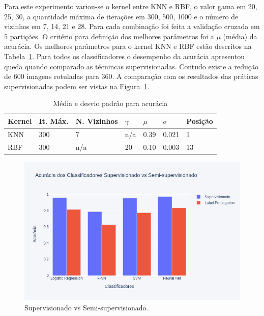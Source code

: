 \documentclass[a4paper, 12 pt, conference]{ieeeconf}  %
\begin{document}
Para este experimento variou-se o kernel entre KNN e RBF, o valor gama em 20, 25, 30, a quantidade máxima de iterações em 300, 500, 1000 e o número de vizinhos em 7, 14, 21 e 28. Para cada combinação foi feita a validação cruzada em 5 partições. O critério para definição dos melhores parâmetros foi a $\mu$ (média) da acurácia. Os melhores parâmetros para o kernel KNN e RBF estão descritos na Tabela~\ref{tab:meida_acuracia_lp_lbp}. Para todos os classificadores o desempenho da acurácia apresentou queda quando comparado as técnincas supervisionadas. Contudo existe a redução de 600 imagens rotuladas para 360. A comparação com os resultados das práticas supervisionadas podem ser vistas na Figura~\ref{fig:super_vs_semi_lbp}.


\begin{table}[!htbp]
    \caption{Média e desvio padrão para acurácia}
    \begin{center}
        \begin{tabular}{lllllll}
        	Kernel & It. Máx. & N. Vizinhos & $\gamma$ & $\mu$ & $\sigma$ & Posição \\
        	\hline
        	KNN    & 300             & 7                  & n/a  & 0.39       & 0.021               & 1       \\
        	\hline
        	RBF    & 300             & n/a                & 20   & 0.10       & 0.003               & 13      \\
        \end{tabular}
    \label{tab:meida_acuracia_lp_lbp}
    \end{center}
\end{table}

\begin{figure}[!htbp]
	\centering
	\includegraphics[width=1.0\linewidth,clip=true,trim=0cm 0cm 0cm 0cm, keepaspectratio=true]{bar_supervisionado_vs_semi_lbp.png}
	\caption{Supervisionado vs Semi-supervisionado.}
	\label{fig:super_vs_semi_lbp}
\end{figure}
\end{document}
